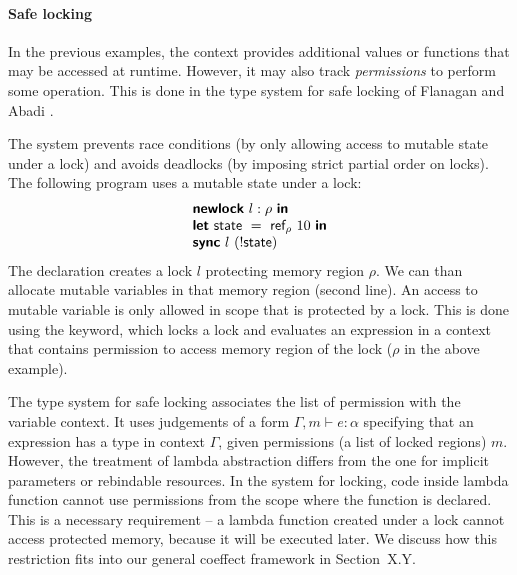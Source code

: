 \paragraph{Safe locking}
In the previous examples, the context provides additional values or functions that may be accessed
at runtime. However, it may also track \emph{permissions} to perform some operation. This is done
in the type system for safe locking of Flanagan and Abadi \cite{app-safe-locking}.

The system prevents race conditions (by only allowing access to mutable state under a lock)
and avoids deadlocks (by imposing strict partial order on locks). The following 
program uses a mutable state under a lock:
%
\begin{equation*}
\begin{array}{l}
\kvd{newlock}~l:\rho~\kvd{in}\\
\kvd{let}~\ident{state}~=~\ident{ref}_\rho~10~\kvd{in}\\
\kvd{sync}~l~(!\ident{state})
\end{array}
\end{equation*}
%
The declaration  creates a lock $l$ protecting memory region $\rho$. We can than
allocate mutable variables in that memory region (second line). An access to mutable variable
is only allowed in scope that is protected by a lock. This is done using the  keyword,
which locks a lock and evaluates an expression in a context that contains permission to access
memory region of the lock ($\rho$ in the above example).

The type system for safe locking associates the list of permission with the variable context.
It uses judgements of a form $\Gamma, m \vdash e : \alpha$ specifying that an expression has a
type in context $\Gamma$, given permissions (a list of locked regions) $m$. However, the treatment
of lambda abstraction differs from the one for implicit parameters or rebindable resources.
In the system for locking, code inside lambda function cannot use permissions from the scope
where the function is declared. This is a necessary requirement -- a lambda function created 
under a lock cannot access protected memory, because it will be executed later. We discuss how
this restriction fits into our general coeffect framework in Section~X.Y.

%
%


